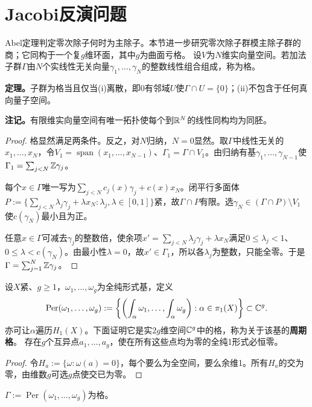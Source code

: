 \section{Jacobi反演问题}
Abel定理判定零次除子何时为主除子。本节进一步研究零次除子群模主除子群的商；它同构于一个复$g$维环面，其中$g$为曲面亏格。
设$V$为$N$维实向量空间。若加法子群$\Gamma$由$N$个实线性无关向量$\gamma_1,\ldots,\gamma_N$的整数线性组合组成，称为格。

\textbf{定理。}子群为格当且仅当(i)离散，即0有邻域$U$使$\Gamma\cap U=\{0\}$；(ii)不包含于任何真向量子空间。

\textbf{注记。}有限维实向量空间有唯一拓扑使每个到$\mathbb R^N$的线性同构均为同胚。
\begin{proof}
格显然满足两条件。反之，对$N$归纳，$N=0$显然。取$\Gamma$中线性无关的$x_1,\ldots,x_N$，令$V_1=\operatorname{span}(x_1,\ldots,x_{N-1})$、$\Gamma_1=\Gamma\cap V_1$。由归纳有基$\gamma_1,\ldots,\gamma_{N-1}$使$\Gamma_1=\sum_{j<N}\mathbb Z\gamma_j$。

每个$x\in\Gamma$唯一写为$\sum_{j<N}c_j(x)\gamma_j+c(x)x_N$。闭平行多面体$P:=\{\sum_{j<N}\lambda_j\gamma_j+\lambda x_N:\lambda_j,\lambda\in[0,1]\}$紧，故$\Gamma\cap P$有限。选$\gamma_N\in(\Gamma\cap P)\setminus V_1$使$c(\gamma_N)$最小且为正。

任意$x\in\Gamma$可减去$\gamma_j$的整数倍，使余项$x'=\sum_{j<N}\lambda_j\gamma_j+\lambda x_N$满足$0\le\lambda_j<1$、$0\le\lambda<c(\gamma_N)$。由最小性$\lambda=0$，故$x'\in\Gamma_1$，所以各$\lambda_j$为整数，只能全零。于是$\Gamma=\sum_{j=1}^N\mathbb Z\gamma_j$。
\end{proof}
设$X$紧、$g\ge1$，$\omega_1,\ldots,\omega_g$为全纯形式基，定义
\[
\operatorname{Per}(\omega_1,\ldots,\omega_g):=\left\{\left(\int_\alpha\omega_1,\ldots,\int_\alpha\omega_g\right):\alpha\in\pi_1(X)\right\}\subset\mathbb C^g.
\]
亦可让$\alpha$遍历$H_1(X)$。下面证明它是实$2g$维空间$\mathbb C^g$中的格，称为关于该基的\textbf{周期格}。
存在$g$个互异点$a_1,\ldots,a_g$，使在所有这些点均为零的全纯1形式必恒零。
\begin{proof}
令$H_a:=\{\omega:\omega(a)=0\}$，每个要么为全空间，要么余维1。所有$H_a$的交为零，由维数$g$可选$g$点使交已为零。
\end{proof}
$\Gamma:=\operatorname{Per}(\omega_1,\ldots,\omega_g)$为格。
